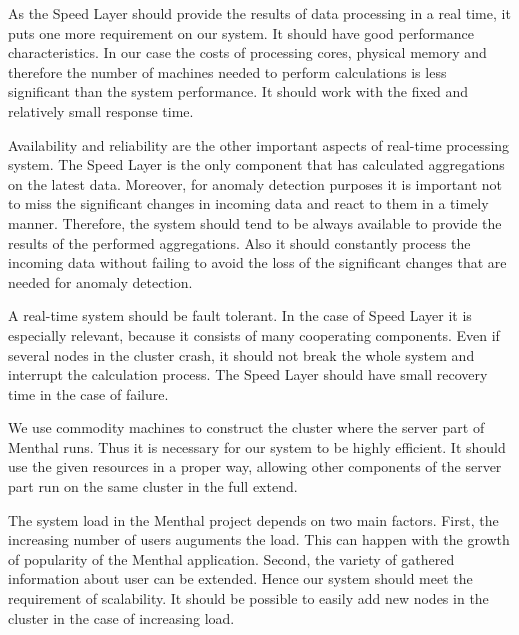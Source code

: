As the Speed Layer should provide the results of data processing in a real time, it puts one more requirement on our system.
It should have good performance characteristics.
In our case the costs of processing cores, physical memory and therefore the number of machines needed to perform calculations is less significant than the system performance.
It should work with the fixed and relatively small response time. 

Availability and reliability are the other important aspects of real-time processing system.
The Speed Layer is the only component that has calculated aggregations on the latest data.
Moreover, for anomaly detection purposes it is important not to miss the significant changes in incoming data and react to them in a timely manner.
Therefore, the system should tend to be always available to provide the results of the performed aggregations.
Also it should constantly process the incoming data without failing to avoid the loss of the significant changes that are needed for anomaly detection. 

A real-time system should be fault tolerant.
In the case of Speed Layer it is especially relevant, because it consists of many cooperating components.
Even if several nodes in the cluster crash, it should not break the whole system and interrupt the calculation process.
The Speed Layer should have small recovery time in the case of failure. 

We use commodity machines to construct the cluster where the server part of Menthal runs.
Thus it is necessary for our system to be highly efficient.
It should use the given resources in a proper way, allowing other components of the server part run on the same cluster in the full extend.

The system load in the Menthal project depends on two main factors.
First, the increasing number of users auguments the load.
This can happen with the growth of popularity of the Menthal application.
Second, the variety of gathered information about user can be extended.
Hence our system should meet the requirement of scalability.
It should be possible to easily add new nodes in the cluster in the case of increasing load.  

